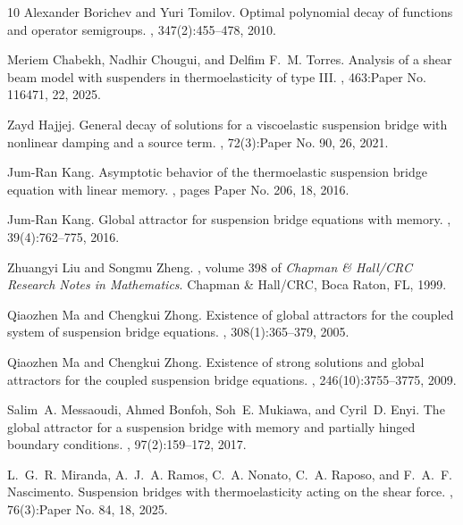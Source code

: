 \documentclass[11pt,reqno]{article}
\begin{document}
\begin{thebibliography}{10}
Alexander Borichev and Yuri Tomilov.
\newblock Optimal polynomial decay of functions and operator semigroups.
, 347(2):455--478, 2010.

Meriem Chabekh, Nadhir Chougui, and Delfim F.~M. Torres.
\newblock Analysis of a shear beam model with suspenders in thermoelasticity of
  type {III}.
, 463:Paper No. 116471, 22, 2025.

Zayd Hajjej.
\newblock General decay of solutions for a viscoelastic suspension bridge with
  nonlinear damping and a source term.
, 72(3):Paper No. 90, 26, 2021.

Jum-Ran Kang.
\newblock Asymptotic behavior of the thermoelastic suspension bridge equation
  with linear memory.
, pages Paper No. 206, 18, 2016.

Jum-Ran Kang.
\newblock Global attractor for suspension bridge equations with memory.
, 39(4):762--775, 2016.

Zhuangyi Liu and Songmu Zheng.
, volume 398 of
  {\em Chapman \& Hall/CRC Research Notes in Mathematics}.
\newblock Chapman \& Hall/CRC, Boca Raton, FL, 1999.

Qiaozhen Ma and Chengkui Zhong.
\newblock Existence of global attractors for the coupled system of suspension
  bridge equations.
, 308(1):365--379, 2005.

Qiaozhen Ma and Chengkui Zhong.
\newblock Existence of strong solutions and global attractors for the coupled
  suspension bridge equations.
, 246(10):3755--3775, 2009.

Salim~A. Messaoudi, Ahmed Bonfoh, Soh~E. Mukiawa, and Cyril~D. Enyi.
\newblock The global attractor for a suspension bridge with memory and
  partially hinged boundary conditions.
, 97(2):159--172, 2017.

L.~G.~R. Miranda, A.~J.~A. Ramos, C.~A. Nonato, C.~A. Raposo, and F.~A.~F.
  Nascimento.
\newblock Suspension bridges with thermoelasticity acting on the shear force.
, 76(3):Paper No. 84, 18, 2025.


\end{thebibliography}
\end{document}
